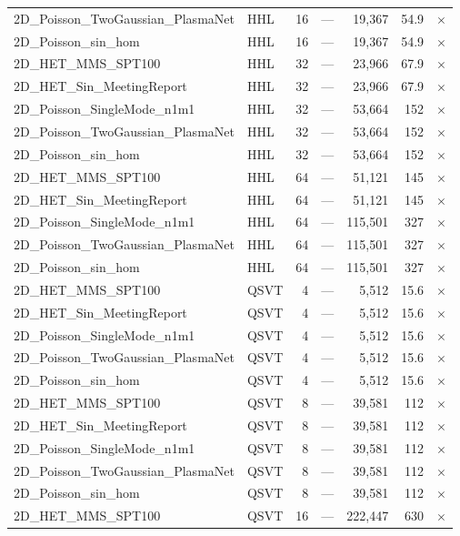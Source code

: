 \begin{table}[htbp]
\begin{tabular}{llrrrrl}
    2D\_Poisson\_TwoGaussian\_PlasmaNet & HHL & 16 & --- & 19,367 & 54.9 & $\times$ \\
    2D\_Poisson\_sin\_hom & HHL & 16 & --- & 19,367 & 54.9 & $\times$ \\
    2D\_HET\_MMS\_SPT100 & HHL & 32 & --- & 23,966 & 67.9 & $\times$ \\
    2D\_HET\_Sin\_MeetingReport & HHL & 32 & --- & 23,966 & 67.9 & $\times$ \\
    2D\_Poisson\_SingleMode\_n1m1 & HHL & 32 & --- & 53,664 & 152 & $\times$ \\
    2D\_Poisson\_TwoGaussian\_PlasmaNet & HHL & 32 & --- & 53,664 & 152 & $\times$ \\
    2D\_Poisson\_sin\_hom & HHL & 32 & --- & 53,664 & 152 & $\times$ \\
    2D\_HET\_MMS\_SPT100 & HHL & 64 & --- & 51,121 & 145 & $\times$ \\
    2D\_HET\_Sin\_MeetingReport & HHL & 64 & --- & 51,121 & 145 & $\times$ \\
    2D\_Poisson\_SingleMode\_n1m1 & HHL & 64 & --- & 115,501 & 327 & $\times$ \\
    2D\_Poisson\_TwoGaussian\_PlasmaNet & HHL & 64 & --- & 115,501 & 327 & $\times$ \\
    2D\_Poisson\_sin\_hom & HHL & 64 & --- & 115,501 & 327 & $\times$ \\
    2D\_HET\_MMS\_SPT100 & QSVT & 4 & --- & 5,512 & 15.6 & $\times$ \\
    2D\_HET\_Sin\_MeetingReport & QSVT & 4 & --- & 5,512 & 15.6 & $\times$ \\
    2D\_Poisson\_SingleMode\_n1m1 & QSVT & 4 & --- & 5,512 & 15.6 & $\times$ \\
    2D\_Poisson\_TwoGaussian\_PlasmaNet & QSVT & 4 & --- & 5,512 & 15.6 & $\times$ \\
    2D\_Poisson\_sin\_hom & QSVT & 4 & --- & 5,512 & 15.6 & $\times$ \\
    2D\_HET\_MMS\_SPT100 & QSVT & 8 & --- & 39,581 & 112 & $\times$ \\
    2D\_HET\_Sin\_MeetingReport & QSVT & 8 & --- & 39,581 & 112 & $\times$ \\
    2D\_Poisson\_SingleMode\_n1m1 & QSVT & 8 & --- & 39,581 & 112 & $\times$ \\
    2D\_Poisson\_TwoGaussian\_PlasmaNet & QSVT & 8 & --- & 39,581 & 112 & $\times$ \\
    2D\_Poisson\_sin\_hom & QSVT & 8 & --- & 39,581 & 112 & $\times$ \\
    2D\_HET\_MMS\_SPT100 & QSVT & 16 & --- & 222,447 & 630 & $\times$ \\

\end{tabular}
\end{table}

